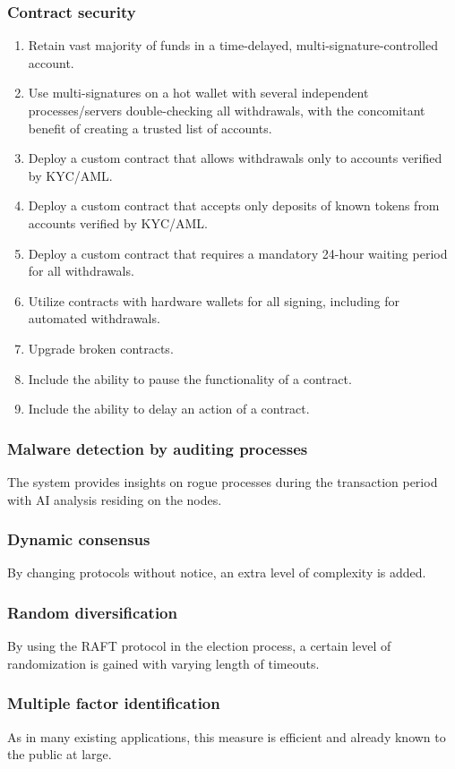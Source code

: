 \documentclass[]{article}
\begin{document}
{\subsubsection{Contract security}
\begin{enumerate}
	\item Retain vast majority of funds in a time-delayed, multi-signature-controlled account.
	\item Use multi-signatures on a hot wallet with several independent processes/servers double-checking all withdrawals, with the concomitant benefit of creating a trusted list of accounts.
	\item Deploy a custom contract that allows withdrawals only to accounts verified by KYC/AML.
	\item Deploy a custom contract that accepts only deposits of known tokens from accounts verified by KYC/AML.
	\item Deploy a custom contract that requires a mandatory 24-hour waiting period for all withdrawals.
	\item Utilize contracts with hardware wallets for all signing, including for automated withdrawals.
	\item Upgrade broken contracts.
	\item Include the ability to pause the functionality of a contract.
	\item Include the ability to delay an action of a contract.
\end{enumerate}
\subsubsection{Malware detection by auditing processes}
The system provides insights on rogue processes during the transaction period with AI analysis residing on the nodes. 
\subsubsection{Dynamic consensus}
By changing protocols without notice, an extra level of complexity is added.
\subsubsection{Random diversification}
By using the RAFT protocol in the election process, a certain level of randomization is gained with varying length of timeouts.
\subsubsection{Multiple factor identification}
As in many existing applications, this measure is efficient and already known to the public at large.
}
\end{document}
